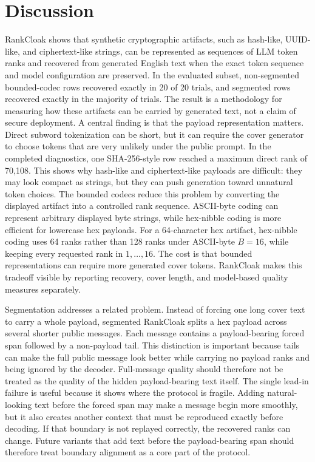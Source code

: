 \documentclass[fleqn,10pt]{wlscirep}
\begin{document}
\section*{Discussion}

RankCloak shows that synthetic cryptographic artifacts, such as hash-like, UUID-like, and ciphertext-like strings, can be represented as sequences of LLM token ranks and recovered from generated English text when the exact token sequence and model configuration are preserved. In the evaluated subset, non-segmented bounded-codec rows recovered exactly in 20 of 20 trials, and segmented rows recovered exactly in the majority of trials. The result is a methodology for measuring how these artifacts can be carried by generated text, not a claim of secure deployment.
A central finding is that the payload representation matters. Direct subword tokenization can be short, but it can require the cover generator to choose tokens that are very unlikely under the public prompt. In the completed diagnostics, one SHA-256-style row reached a maximum direct rank of 70,108. This shows why hash-like and ciphertext-like payloads are difficult: they may look compact as strings, but they can push generation toward unnatural token choices.
The bounded codecs reduce this problem by converting the displayed artifact into a controlled rank sequence. ASCII-byte coding can represent arbitrary displayed byte strings, while hex-nibble coding is more efficient for lowercase hex payloads. For a 64-character hex artifact, hex-nibble coding uses 64 ranks rather than 128 ranks under ASCII-byte \(B=16\), while keeping every requested rank in \(1,\ldots,16\). The cost is that bounded representations can require more generated cover tokens. RankCloak makes this tradeoff visible by reporting recovery, cover length, and model-based quality measures separately.

Segmentation addresses a related problem. Instead of forcing one long cover text to carry a whole payload, segmented RankCloak splits a hex payload across several shorter public messages. Each message contains a payload-bearing forced span followed by a non-payload tail. This distinction is important because tails can make the full public message look better while carrying no payload ranks and being ignored by the decoder. Full-message quality should therefore not be treated as the quality of the hidden payload-bearing text itself.
The single lead-in failure is useful because it shows where the protocol is fragile. Adding natural-looking text before the forced span may make a message begin more smoothly, but it also creates another context that must be reproduced exactly before decoding. If that boundary is not replayed correctly, the recovered ranks can change. Future variants that add text before the payload-bearing span should therefore treat boundary alignment as a core part of the protocol.
\end{document}

